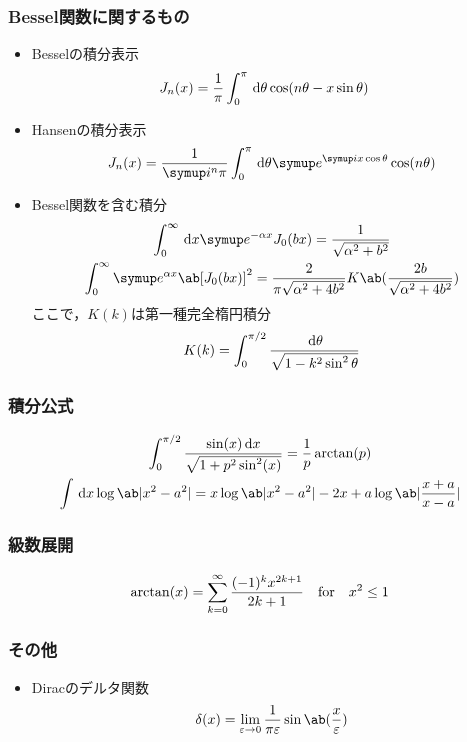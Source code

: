 \subsubsection{Bessel関数に関するもの}
\begin{itemize}%
  \item Besselの積分表示
    \begin{align}
      J_n(x) &= \frac{1}{\pi} \int_0^\pi \dl{\theta \cos(n\theta - x \sin\theta)}
    \end{align}%
  \item Hansenの積分表示
    \begin{gather}%
      J_n(x) = \frac{1}{\i^n \pi} \int_0^\pi \dl{\theta} \e^{\i x\cos\theta} \cos(n\theta)
    \end{gather}%
  \item Bessel関数を含む積分
    \begin{gather}%
      \int_0^\infty \dl{x} \e^{-\alpha x} J_0(bx) = \frac{1}{\sqrt{\alpha^2 + b^2}}\\
      \int_0^\infty \e^{\alpha x} \ab[J_0(bx)]^2 =
      \frac{2}{\pi\sqrt{\alpha^2 + 4b^2}} K\ab(\frac{2b}{\sqrt{\alpha^2 + 4b^2}}) 
    \end{gather}%
    ここで，$K(k)$は第一種完全楕円積分
    \begin{gather}%
      K(k) = \int_0^{\pi/2} \frac{\dl{\theta}}{\sqrt{1-k^2\sin^2\theta}}
    \end{gather}%
\end{itemize}%

\subsubsection{積分公式}
\begin{gather}%
  \label{eq:3.676}
  \int_0^{\pi/2} \frac{\sin(x) \dl{x}}{\sqrt{1+p^2\sin^2(x)}} 
  = \frac{1}{p}\arctan(p)\\
  \label{eq:2.736}
  \int \dl{x} \log \ab|x^2 - a^2|  = x \log\ab|x^2-a^2| - 2x + a \log \ab|\frac{x+a}{x-a}|\\
\end{gather}

\subsubsection{級数展開}
\begin{gather}%
  \label{eq:1.643}
  \arctan(x) = \sum_{k=0}^\infty \frac{(-1)^k x^{2k+1}}{2k+1} \qqtext{for} x^2 \leq 1
\end{gather}%

\subsubsection{その他}
\begin{itemize}%
  \item Diracのデルタ関数
    \begin{gather}%
      \delta(x) = \lim_{\eps \to 0} \frac{1}{\pi \eps}\sin\ab(\frac{x}{\eps})
    \end{gather}%
\end{itemize}%
